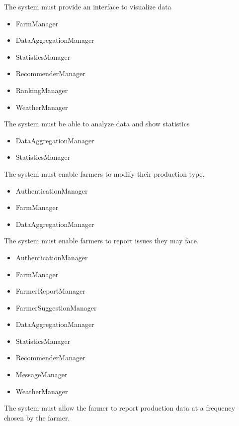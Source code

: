 \begin{itemize}
\begin{itemize}
\end{itemize}
 The system must provide an interface to visualize data
\begin{itemize}


\item FarmManager
\item DataAggregationManager
\item StatisticsManager
\item RecommenderManager
\item RankingManager
\item WeatherManager


\end{itemize}
 The system must be able to analyze data and show statistics
\begin{itemize}


\item DataAggregationManager
\item StatisticsManager

\end{itemize}
 The system must enable farmers to modify their production type.
\begin{itemize}


\item AuthenticationManager
\item FarmManager
\item DataAggregationManager

\end{itemize}


 The system must enable farmers to report issues they may face.
\begin{itemize}

\item AuthenticationManager
\item FarmManager
\item FarmerReportManager
\item FarmerSuggestionManager
\item DataAggregationManager
\item StatisticsManager
\item RecommenderManager
\item MessageManager
\item WeatherManager

\end{itemize}

 The system must allow the farmer to report production data at a frequency chosen by the farmer.
\begin{itemize}


\end{itemize}
\end{itemize}
